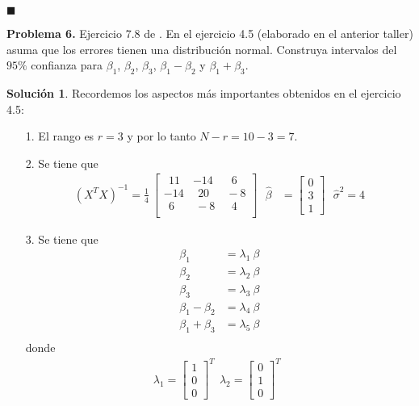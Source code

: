 \documentclass[12pt]{article}
\theoremstyle{plain}
\theoremstyle{definition}
\theoremstyle{definition}
\theoremstyle{definition}
\newtheorem*{solution}{Solución}
\begin{document}
\begin{flushright}
$\blacksquare$
\end{flushright}
\newpage
\noindent \textbf{Problema 6.} Ejercicio 7.8 de \cite{ravishanker2001first}. En el ejercicio 4.5 (elaborado en el anterior taller) asuma que los errores tienen una distribución normal. Construya intervalos del $95\%$ confianza para $\beta_1$, $\beta_2$, $\beta_3$, $\beta_1-\beta_2$ y $\beta_1+\beta_3$.
\begin{solution}
Recordemos los aspectos más importantes obtenidos en el ejercicio 4.5:
\begin{itemize}
    \item[1.] El rango es $r=3$ y por lo tanto $N-r=10-3=7$.
    \item[2.] Se tiene que 
    \begin{align*}
        (X^TX)^{-1} =  \frac{1}{4} \ \begin{bmatrix}
    \ \ 11 & -14 & \ \ \ 6 \\
     -14 & \ \ 20 & \ -8 \\
    \ \ 6 & \ -8 & \ \ \ 4 \\
\end{bmatrix}
        \ \ \
        \hat{\beta} &= \begin{bmatrix}
            0 \\ 3 \\ 1
        \end{bmatrix} \ \ \ 
        \hat{\sigma}^2 = 4 
    \end{align*}
    \item[3.] Se tiene que 
    \begin{align*}
    \beta_1 &= \lambda_1 \ \beta \\
    \beta_2 &= \lambda_2 \ \beta \\
    \beta_3 &= \lambda_3 \ \beta \\
    \beta_1 - \beta_2 &= \lambda_4 \ \beta \\
    \beta_1 + \beta_3 &= \lambda_5 \ \beta \\
\end{align*}
donde
\begin{align*}
    \lambda_1 = \begin{bmatrix} 1 \\ 0 \\ 0 
    \end{bmatrix}^T \ \ 
    \lambda_2 = \begin{bmatrix} 0 \\ 1 \\ 0 
    \end{bmatrix}^T \ \ 

\end{align*}
\end{itemize}
\end{solution}
\end{document}
